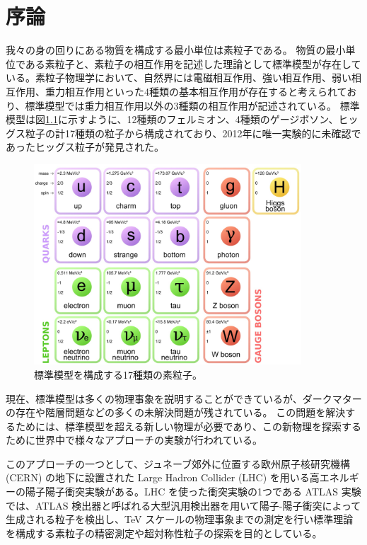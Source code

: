 \chapter{序論}
我々の身の回りにある物質を構成する最小単位は素粒子である。
物質の最小単位である素粒子と、素粒子の相互作用を記述した理論として標準模型が存在している。素粒子物理学において、自然界には電磁相互作用、強い相互作用、弱い相互作用、重力相互作用といった4種類の基本相互作用が存在すると考えられており、標準模型では重力相互作用以外の3種類の相互作用が記述されている。
標準模型は図\ref{fig:標準模型}に示すように、12種類のフェルミオン、4種類のゲージボソン、ヒッグス粒子の計17種類の粒子から構成されており、2012年に唯一実験的に未確認であったヒッグス粒子が発見された\cite{article:Higgs_boson}。
\begin{figure}[tb]
  \centering
  \includegraphics[clip, width=10cm]{fig/1/standardmodel.jpg}
  \caption{標準模型を構成する17種類の素粒子\cite{article:elementary_particles}。}
  \label{fig:標準模型}
\end{figure}

現在、標準模型は多くの物理事象を説明することができているが、ダークマターの存在や階層問題などの多くの未解決問題が残されている。
この問題を解決するためには、標準模型を超える新しい物理が必要であり、この新物理を探索するために世界中で様々なアプローチの実験が行われている。

このアプローチの一つとして、ジュネーブ郊外に位置する欧州原子核研究機構 (CERN) の地下に設置された Large Hadron Collider (LHC) を用いる高エネルギーの陽子陽子衝突実験がある。LHC を使った衝突実験の1つである ATLAS 実験では、ATLAS 検出器と呼ばれる大型汎用検出器を用いて陽子-陽子衝突によって生成される粒子を検出し、TeV スケールの物理事象までの測定を行い標準理論を構成する素粒子の精密測定や超対称性粒子の探索を目的としている。


